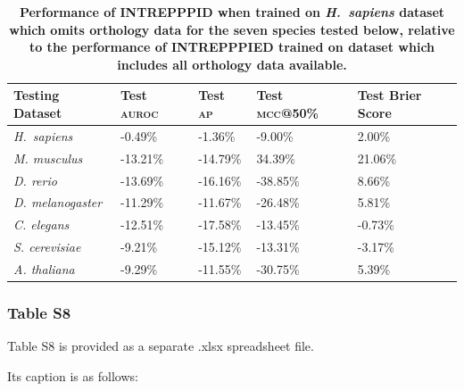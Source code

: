 \newpage

\begin{table}[!h]
\centering
	\caption[Change in \textsc{intrepppid} performance when omitting orthology data.]{\textsf{\textbf{Performance of INTREPPPID when trained on \textit{H.~sapiens} dataset which omits orthology data for the seven species tested below, relative to the performance of INTREPPPIED trained on dataset which includes all orthology data available.}}} \label{tab:intrepppid_supp_no_ortho} {\begin{tabular}{@{}lllll@{}}\toprule 
			Testing Dataset & Test \textsc{auroc} & Test \textsc{ap} & Test \textsc{mcc}@50\% & Test Brier Score  \\\midrule
			\textit{H.~sapiens} & -0.49\% & -1.36\% & -9.00\% & 2.00\% \\
            \textit{M. musculus} & -13.21\% & -14.79\% & 34.39\%  & 21.06\% \\
            \textit{D. rerio} & -13.69\% & -16.16\% & -38.85\%  & 8.66\% \\
            \textit{D. melanogaster} & -11.29\% & -11.67\% & -26.48\%  & 5.81\% \\
            \textit{C. elegans} & -12.51\% & -17.58\% & -13.45\%  & -0.73\% \\
            \textit{S. cerevisiae} & -9.21\% & -15.12\% & -13.31\%  & -3.17\% \\
            \textit{A. thaliana} & -9.29\% & -11.55\% & -30.75\%  & 5.39\% \\
			\midrule
	\end{tabular}}{}
\end{table}

\newpage

\subsubsection*{Table S8}
\label{sec:intrepppid_supp_s8}

Table S8 is provided as a separate .xlsx spreadsheet file.
\addtocounter{table}{1}

Its caption is as follows:

